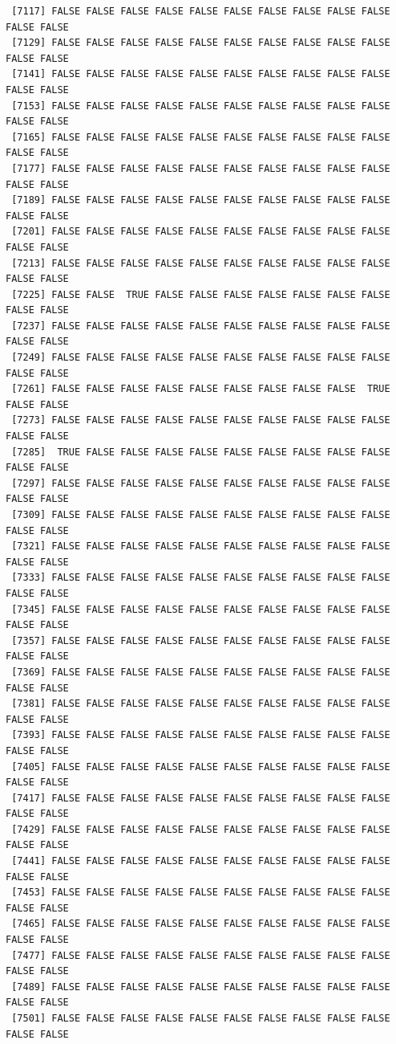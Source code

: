\documentclass[
  a4paper,
  DIV=11,
  numbers=noendperiod]{scrartcl}
\begin{document}
\begin{verbatim}
 [7117] FALSE FALSE FALSE FALSE FALSE FALSE FALSE FALSE FALSE FALSE FALSE FALSE
 [7129] FALSE FALSE FALSE FALSE FALSE FALSE FALSE FALSE FALSE FALSE FALSE FALSE
 [7141] FALSE FALSE FALSE FALSE FALSE FALSE FALSE FALSE FALSE FALSE FALSE FALSE
 [7153] FALSE FALSE FALSE FALSE FALSE FALSE FALSE FALSE FALSE FALSE FALSE FALSE
 [7165] FALSE FALSE FALSE FALSE FALSE FALSE FALSE FALSE FALSE FALSE FALSE FALSE
 [7177] FALSE FALSE FALSE FALSE FALSE FALSE FALSE FALSE FALSE FALSE FALSE FALSE
 [7189] FALSE FALSE FALSE FALSE FALSE FALSE FALSE FALSE FALSE FALSE FALSE FALSE
 [7201] FALSE FALSE FALSE FALSE FALSE FALSE FALSE FALSE FALSE FALSE FALSE FALSE
 [7213] FALSE FALSE FALSE FALSE FALSE FALSE FALSE FALSE FALSE FALSE FALSE FALSE
 [7225] FALSE FALSE  TRUE FALSE FALSE FALSE FALSE FALSE FALSE FALSE FALSE FALSE
 [7237] FALSE FALSE FALSE FALSE FALSE FALSE FALSE FALSE FALSE FALSE FALSE FALSE
 [7249] FALSE FALSE FALSE FALSE FALSE FALSE FALSE FALSE FALSE FALSE FALSE FALSE
 [7261] FALSE FALSE FALSE FALSE FALSE FALSE FALSE FALSE FALSE  TRUE FALSE FALSE
 [7273] FALSE FALSE FALSE FALSE FALSE FALSE FALSE FALSE FALSE FALSE FALSE FALSE
 [7285]  TRUE FALSE FALSE FALSE FALSE FALSE FALSE FALSE FALSE FALSE FALSE FALSE
 [7297] FALSE FALSE FALSE FALSE FALSE FALSE FALSE FALSE FALSE FALSE FALSE FALSE
 [7309] FALSE FALSE FALSE FALSE FALSE FALSE FALSE FALSE FALSE FALSE FALSE FALSE
 [7321] FALSE FALSE FALSE FALSE FALSE FALSE FALSE FALSE FALSE FALSE FALSE FALSE
 [7333] FALSE FALSE FALSE FALSE FALSE FALSE FALSE FALSE FALSE FALSE FALSE FALSE
 [7345] FALSE FALSE FALSE FALSE FALSE FALSE FALSE FALSE FALSE FALSE FALSE FALSE
 [7357] FALSE FALSE FALSE FALSE FALSE FALSE FALSE FALSE FALSE FALSE FALSE FALSE
 [7369] FALSE FALSE FALSE FALSE FALSE FALSE FALSE FALSE FALSE FALSE FALSE FALSE
 [7381] FALSE FALSE FALSE FALSE FALSE FALSE FALSE FALSE FALSE FALSE FALSE FALSE
 [7393] FALSE FALSE FALSE FALSE FALSE FALSE FALSE FALSE FALSE FALSE FALSE FALSE
 [7405] FALSE FALSE FALSE FALSE FALSE FALSE FALSE FALSE FALSE FALSE FALSE FALSE
 [7417] FALSE FALSE FALSE FALSE FALSE FALSE FALSE FALSE FALSE FALSE FALSE FALSE
 [7429] FALSE FALSE FALSE FALSE FALSE FALSE FALSE FALSE FALSE FALSE FALSE FALSE
 [7441] FALSE FALSE FALSE FALSE FALSE FALSE FALSE FALSE FALSE FALSE FALSE FALSE
 [7453] FALSE FALSE FALSE FALSE FALSE FALSE FALSE FALSE FALSE FALSE FALSE FALSE
 [7465] FALSE FALSE FALSE FALSE FALSE FALSE FALSE FALSE FALSE FALSE FALSE FALSE
 [7477] FALSE FALSE FALSE FALSE FALSE FALSE FALSE FALSE FALSE FALSE FALSE FALSE
 [7489] FALSE FALSE FALSE FALSE FALSE FALSE FALSE FALSE FALSE FALSE FALSE FALSE
 [7501] FALSE FALSE FALSE FALSE FALSE FALSE FALSE FALSE FALSE FALSE FALSE FALSE

\end{verbatim}
\end{document}
